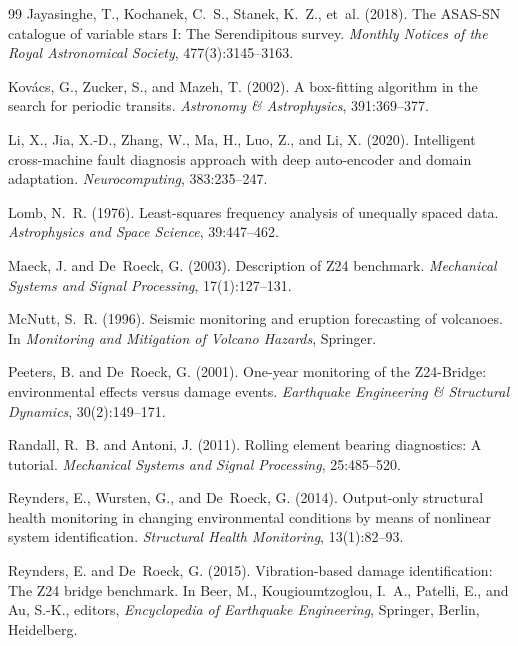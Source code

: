 \documentclass[11pt,a4paper]{article}
\begin{document}
\begin{thebibliography}{99}
Jayasinghe, T., Kochanek, C.~S., Stanek, K.~Z., et~al. (2018).
\newblock The {ASAS-SN} catalogue of variable stars {I}: The {Serendipitous} survey.
\newblock \textit{Monthly Notices of the Royal Astronomical Society}, 477(3):3145--3163.

Kov{\'a}cs, G., Zucker, S., and Mazeh, T. (2002).
\newblock A box-fitting algorithm in the search for periodic transits.
\newblock \textit{Astronomy \& Astrophysics}, 391:369--377.

Li, X., Jia, X.-D., Zhang, W., Ma, H., Luo, Z., and Li, X. (2020).
\newblock Intelligent cross-machine fault diagnosis approach with deep auto-encoder and domain adaptation.
\newblock \textit{Neurocomputing}, 383:235--247.

Lomb, N.~R. (1976).
\newblock Least-squares frequency analysis of unequally spaced data.
\newblock \textit{Astrophysics and Space Science}, 39:447--462.

Maeck, J. and De~Roeck, G. (2003).
\newblock Description of {Z24} benchmark.
\newblock \textit{Mechanical Systems and Signal Processing}, 17(1):127--131.

McNutt, S.~R. (1996).
\newblock Seismic monitoring and eruption forecasting of volcanoes.
\newblock In \textit{Monitoring and Mitigation of Volcano Hazards}, Springer.

Peeters, B. and De~Roeck, G. (2001).
\newblock One-year monitoring of the {Z24-Bridge}: environmental effects versus damage events.
\newblock \textit{Earthquake Engineering \& Structural Dynamics}, 30(2):149--171.

Randall, R.~B. and Antoni, J. (2011).
\newblock Rolling element bearing diagnostics: A tutorial.
\newblock \textit{Mechanical Systems and Signal Processing}, 25:485--520.

Reynders, E., Wursten, G., and De~Roeck, G. (2014).
\newblock Output-only structural health monitoring in changing environmental conditions by means of nonlinear system identification.
\newblock \textit{Structural Health Monitoring}, 13(1):82--93.

Reynders, E. and De~Roeck, G. (2015).
\newblock Vibration-based damage identification: The {Z24} bridge benchmark.
\newblock In Beer, M., Kougioumtzoglou, I.~A., Patelli, E., and Au, S.-K., editors, \textit{Encyclopedia of Earthquake Engineering}, Springer, Berlin, Heidelberg.


\end{thebibliography}
\end{document}
